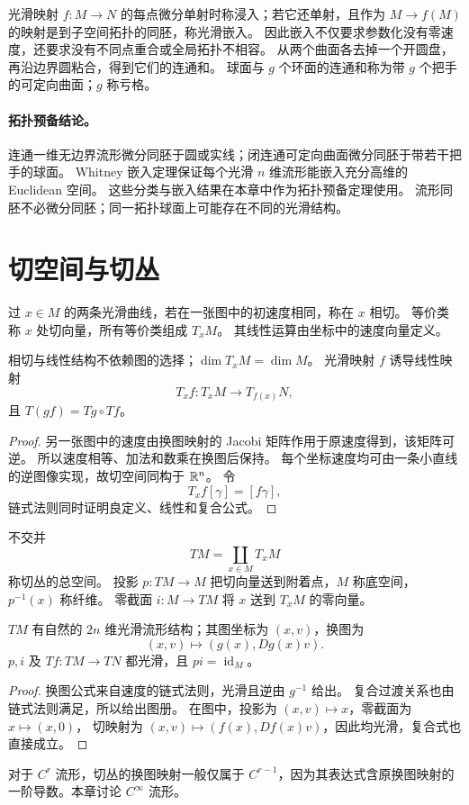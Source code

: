 \begin{definition}[浸入、嵌入与把手]\label{def:immersion-embedding}
光滑映射 $f:M\to N$ 的每点微分单射时称浸入；若它还单射，且作为 $M\to f(M)$ 的映射是到子空间拓扑的同胚，称光滑嵌入。
因此嵌入不仅要求参数化没有零速度，还要求没有不同点重合或全局拓扑不相容。
从两个曲面各去掉一个开圆盘，再沿边界圆粘合，得到它们的连通和。
球面与 $g$ 个环面的连通和称为带 $g$ 个把手的可定向曲面；$g$ 称亏格。
\end{definition}

\paragraph{拓扑预备结论。}
连通一维无边界流形微分同胚于圆或实线；闭连通可定向曲面微分同胚于带若干把手的球面。
Whitney 嵌入定理保证每个光滑 $n$ 维流形能嵌入充分高维的 Euclidean 空间。
这些分类与嵌入结果在本章中作为拓扑预备定理使用。
流形同胚不必微分同胚；同一拓扑球面上可能存在不同的光滑结构。

\section{切空间与切丛}
\begin{definition}
过 $x\in M$ 的两条光滑曲线，若在一张图中的初速度相同，称在 $x$ 相切。
等价类称 $x$ 处切向量，所有等价类组成 $T_xM$。
其线性运算由坐标中的速度向量定义。
\end{definition}
\begin{proposition}
相切与线性结构不依赖图的选择；$\dim T_xM=\dim M$。
光滑映射 $f$ 诱导线性映射
\[
 T_xf:T_xM\to T_{f(x)}N,
\]
且 $T(gf)=Tg\circ Tf$。
\end{proposition}
\begin{proof}
另一张图中的速度由换图映射的 Jacobi 矩阵作用于原速度得到，该矩阵可逆。
所以速度相等、加法和数乘在换图后保持。
每个坐标速度均可由一条小直线的逆图像实现，故切空间同构于 $\mathbb{R}^n$。
令 
\[
 T_xf[\gamma]=[f\gamma],
\]
链式法则同时证明良定义、线性和复合公式。
\end{proof}
\begin{definition}
不交并 
\[
 TM=\coprod_{x\in M}T_xM
\]
 称切丛的总空间。
投影 $p:TM\to M$ 把切向量送到附着点，$M$ 称底空间，$p^{-1}(x)$ 称纤维。
零截面 $i:M\to TM$ 将 $x$ 送到 $T_xM$ 的零向量。
\end{definition}
\begin{theorem}
$TM$ 有自然的 $2n$ 维光滑流形结构；其图坐标为 $(x,v)$，换图为
\[
 (x,v)\longmapsto(g(x),Dg(x)v).
\]
$p,i$ 及 $Tf:TM\to TN$ 都光滑，且 $pi=\operatorname{id}_M$。
\end{theorem}
\begin{proof}
换图公式来自速度的链式法则，光滑且逆由 $g^{-1}$ 给出。
复合过渡关系也由链式法则满足，所以给出图册。
在图中，投影为 $(x,v)\mapsto x$，零截面为 $x\mapsto(x,0)$，
切映射为 $(x,v)\mapsto(f(x),Df(x)v)$，因此均光滑，复合式也直接成立。
\end{proof}
对于 $C^r$ 流形，切丛的换图映射一般仅属于 $C^{r-1}$，因为其表达式含原换图映射的一阶导数。本章讨论 $C^\infty$ 流形。


